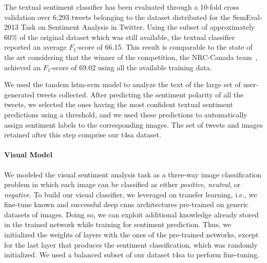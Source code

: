 The textual sentiment classifier has been evaluated through a 10-fold cross validation over 6,293 tweets belonging to the dataset distributed for the SemEval-2013 Task on Sentiment Analysis in Twitter.
Using the subset of approximately 60\% of the original dataset which was still available, the textual classifier reported an average $F_1$-score of 66.15.
This result is comparable to the state of the art considering that the winner of the competition, the NRC-Canada team~\cite{mohammad2013nrc}, achieved an $F_1$-score of 69.02 using all the available training data.

We used the tandem \gls{lstm}-\gls{svm} model to analyze the text of the large set of user-generated tweets collected.
After predicting the sentiment polarity of all the tweets, we selected the ones having the most confident textual sentiment predictions using a threshold, and we used these predictions to automatically assign sentiment labels to the corresponding images.
The set of tweets and images retained after this step comprise our \gls{t4sa} dataset.

\paragraph{Visual Model}
We modeled the visual sentiment analysis task as a three-way image classification problem in which each image can be classified as either \emph{positive}, \emph{neutral}, or \emph{negative}.
To build our visual classifier, we leveraged on transfer learning, i.e., we fine-tune known and successful deep \glspl{cnn} architectures pre-trained on generic datasets of images.
Doing so, we can exploit additional knowledge already stored in the trained network while training for sentiment prediction.
Thus, we initialized the weights of layers with the ones of the pre-trained networks, except for the last layer that produces the sentiment classification, which was randomly initialized.
We used a balanced subset of our dataset \gls{t4sa} to perform fine-tuning.

